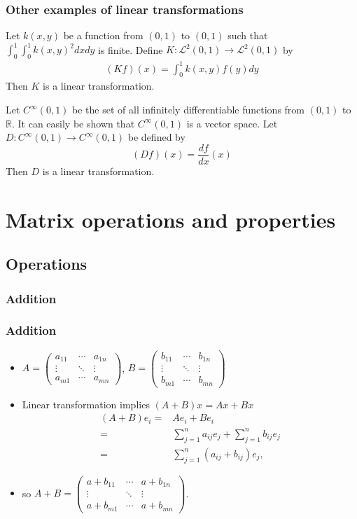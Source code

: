 \documentclass[compress]{beamer}
\def\R{\mathbb{R}}
\newcommand{\gmatrix}[1]{\begin{pmatrix} {#1}_{11} & \cdots &
    {#1}_{1n} \\ \vdots & \ddots & \vdots \\ {#1}_{m1} & \cdots &
    {#1}_{mn} \end{pmatrix}}
\begin{document}
\begin{frame}
  \frametitle{Other examples of linear transformations}
  \begin{example}
    Let $k(x,y)$ be a function from $(0,1)$ to $(0,1)$ such that
    $\int_0^1 \int_0^1 k(x,y)^2 dx dy$ is finite.  Define
    $K:\mathcal{L}^2(0,1) \rightarrow \mathcal{L}^2(0,1)$ by
    \begin{align*}
      (K f) (x) = \int_0^1 k(x,y) f(y) dy
    \end{align*}
    Then $K$ is a linear transformation. 
  \end{example}
  \begin{example}
    Let $C^\infty(0,1)$ be the set of all infinitely differentiable
    functions from $(0,1)$ to $\R$. It can easily be shown that
    $C^\infty(0,1)$ is a vector space. Let $D:C^\infty(0,1) \rightarrow
    C^\infty(0,1)$ be defined by 
    \[ (D f) (x) = \frac{d f}{dx}(x) \]
    Then $D$ is a linear transformation.
  \end{example}
\end{frame}

\section{Matrix operations and properties}
\subsection{Operations}
\subsubsection{Addition} 
\begin{frame}
  \frametitle{Addition}
  \begin{itemize}
  \item $A = \gmatrix{a}$, $B = \gmatrix{b}$ 
  \item Linear transformation  implies $(A+B)x = Ax + Bx$
    \begin{align*}
      (A + B) e_i = & A e_i + B e_i \\
      = & \sum_{j=1}^n a_{ij} e_j + \sum_{j=1}^n b_{ij} e_j\\
      = & \sum_{j=1}^n (a_{ij} + b_{ij}) e_j,
    \end{align*}
  \item so $A + B = \gmatrix{a + b}$.
  \end{itemize}
\end{frame}
\end{document}
